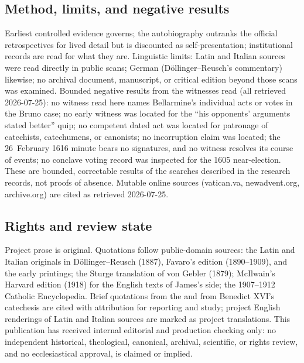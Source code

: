 \subsection{Method, limits, and negative results}

Earliest controlled evidence governs; the autobiography outranks
the official retrospectives for lived detail but is discounted as
self-presentation; institutional records are read for what they
are. Linguistic limits: Latin and Italian sources were read
directly in public scans; German (D\"ollinger--Reusch's
commentary) likewise; no archival document, manuscript, or
critical edition beyond those scans was examined. Bounded negative
results from the witnesses read (all retrieved 2026-07-25): no
witness read here names Bellarmine's individual acts or votes in
the Bruno case; no early witness was located for the
``his opponents' arguments stated better'' quip; no competent
dated act was located for patronage of catechists, catechumens,
or canonists; no incorruption claim was located; the 26~February
1616 minute bears no signatures, and no witness resolves its
course of events; no conclave voting record was inspected for the
1605 near-election. These are bounded, correctable results of the
searches described in the research records, not proofs of
absence. Mutable online sources (vatican.va, newadvent.org,
archive.org) are cited as retrieved 2026-07-25.

\subsection{Rights and review state}

Project prose is original. Quotations follow public-domain
sources: the Latin and Italian originals in D\"ollinger--Reusch
(1887), Favaro's edition (1890--1909), and the early printings;
the Sturge translation of von Gebler (1879); McIlwain's Harvard
edition (1918) for the English texts of James's side; the
1907--1912 Catholic Encyclopedia. Brief quotations from the
 and from Benedict XVI's catechesis
are cited with attribution for reporting and study; project
English renderings of Latin and Italian sources are marked as
project translations. This publication has received internal
editorial and production checking only: no independent
historical, theological, canonical, archival, scientific, or
rights review, and no ecclesiastical approval, is claimed or
implied.

